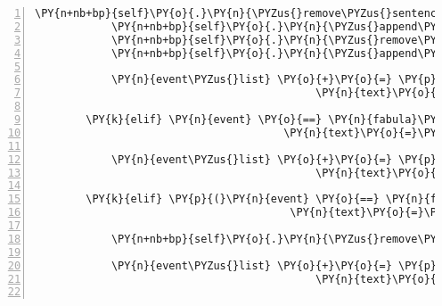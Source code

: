 \begin{Verbatim}[commandchars=\\\{\},numbers=left,firstnumber=1,stepnumber=1]
            \PY{n+nb+bp}{self}\PY{o}{.}\PY{n}{\PYZus{}remove\PYZus{}sentence}\PY{p}{(}\PY{n}{ID\PYZus{}KUNI}\PY{p}{,} \PY{n}{event}\PY{o}{.}\PY{n}{text}\PY{p}{)}
            \PY{n+nb+bp}{self}\PY{o}{.}\PY{n}{\PYZus{}append\PYZus{}sentence}\PY{p}{(}\PY{n}{ID\PYZus{}KUNI}\PY{p}{,} \PY{l+s}{\PYZsq{}}\PY{l+s}{Ich suche den Weg zum Zauberwald!}\PY{l+s}{\PYZsq{}}\PY{p}{)}
            \PY{n+nb+bp}{self}\PY{o}{.}\PY{n}{\PYZus{}remove\PYZus{}sentence}\PY{p}{(}\PY{n}{ID\PYZus{}CASSANDRA}\PY{p}{,} \PY{l+s}{\PYZsq{}}\PY{l+s}{Guten Tag, ich bin die Fee Cassandra.}\PY{l+s}{\PYZsq{}}\PY{p}{)}
            \PY{n+nb+bp}{self}\PY{o}{.}\PY{n}{\PYZus{}append\PYZus{}sentence}\PY{p}{(}\PY{n}{ID\PYZus{}CASSANDRA}\PY{p}{,} \PY{l+s}{\PYZsq{}}\PY{l+s}{Ich bin auf einer Reise, die mich durch den Zauberwald führt!}\PY{l+s}{\PYZsq{}}\PY{p}{)}

            \PY{n}{event\PYZus{}list} \PY{o}{+}\PY{o}{=} \PY{p}{[}\PY{n}{fabula}\PY{o}{.}\PY{n}{SaysEvent}\PY{p}{(}\PY{n}{identifier}\PY{o}{=}\PY{n}{ID\PYZus{}CASSANDRA}\PY{p}{,}
                                            \PY{n}{text}\PY{o}{=}\PY{l+s}{\PYZsq{}}\PY{l+s}{Guten Tag, ich bin die Fee Cassandra.}\PY{l+s}{\PYZsq{}}\PY{p}{)}\PY{p}{]}

        \PY{k}{elif} \PY{n}{event} \PY{o}{==} \PY{n}{fabula}\PY{o}{.}\PY{n}{SaysEvent}\PY{p}{(}\PY{n}{identifier}\PY{o}{=}\PY{n}{ID\PYZus{}KUNI}\PY{p}{,}
                                       \PY{n}{text}\PY{o}{=}\PY{l+s}{\PYZsq{}}\PY{l+s}{Ich suche den Weg zum Zauberwald!}\PY{l+s}{\PYZsq{}}\PY{p}{)}\PY{p}{:}

            \PY{n}{event\PYZus{}list} \PY{o}{+}\PY{o}{=} \PY{p}{[}\PY{n}{fabula}\PY{o}{.}\PY{n}{SaysEvent}\PY{p}{(}\PY{n}{identifier}\PY{o}{=}\PY{n}{ID\PYZus{}CASSANDRA}\PY{p}{,}
                                            \PY{n}{text}\PY{o}{=}\PY{l+s}{\PYZsq{}}\PY{l+s}{Ich ebenfalls.}\PY{l+s}{\PYZsq{}}\PY{p}{)}\PY{p}{]}

        \PY{k}{elif} \PY{p}{(}\PY{n}{event} \PY{o}{==} \PY{n}{fabula}\PY{o}{.}\PY{n}{SaysEvent}\PY{p}{(}\PY{n}{identifier}\PY{o}{=}\PY{n}{ID\PYZus{}KUNI}\PY{p}{,}
                                        \PY{n}{text}\PY{o}{=}\PY{l+s}{\PYZsq{}}\PY{l+s}{Es muss irgendwo einen Eingang zum alten Gnomenweg geben.}\PY{l+s}{\PYZsq{}}\PY{p}{)}\PY{p}{)}\PY{p}{:}

            \PY{n+nb+bp}{self}\PY{o}{.}\PY{n}{\PYZus{}remove\PYZus{}sentence}\PY{p}{(}\PY{n}{ID\PYZus{}KUNI}\PY{p}{,} \PY{n}{event}\PY{o}{.}\PY{n}{text}\PY{p}{)}

            \PY{n}{event\PYZus{}list} \PY{o}{+}\PY{o}{=} \PY{p}{[}\PY{n}{fabula}\PY{o}{.}\PY{n}{SaysEvent}\PY{p}{(}\PY{n}{identifier}\PY{o}{=}\PY{n}{ID\PYZus{}CASSANDRA}\PY{p}{,}
                                            \PY{n}{text}\PY{o}{=}\PY{l+s}{\PYZsq{}}\PY{l+s}{Vielleicht finden wir ja den Eingang!}\PY{l+s}{\PYZsq{}}\PY{p}{)}\PY{p}{]}


\end{Verbatim}
